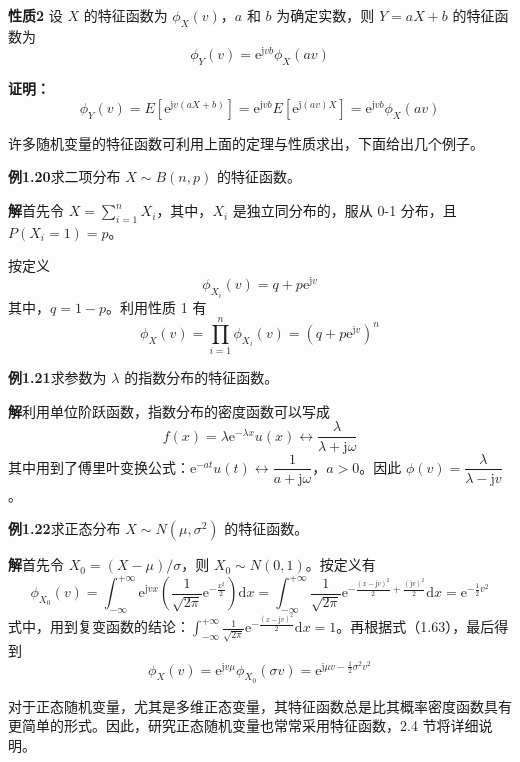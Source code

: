 \documentclass[11pt,openany,UTF8]{ctexbook}
\newcommand{\dif}{\mathrm{d}}                      %
\newcommand{\eu}{\mathrm{e}}                       %
\newcommand{\ju}{\mathrm{j}}                       %
\newcommand{\thm}[1]{\par\medskip\noindent\textbf{#1}\quad}
\begin{document}
\thm{性质2} 设 $X$ 的特征函数为 $\phi_X(v)$\nobreak，$a$ 和 $b$ 为确定实数\nobreak，则 $Y=aX+b$ 的特征函数为
\begin{equation}
\phi_Y(v)=\eu^{\ju vb}\phi_X(av)
\label{eq:1.63}
\end{equation}

\textbf{证明\nobreak：}\quad
\[
\phi_Y(v)=E\left[\eu^{\ju v(aX+b)}\right]=\eu^{\ju vb}E\left[\eu^{\ju(av)X}\right]=\eu^{\ju vb}\phi_X(av)
\]

许多随机变量的特征函数可利用上面的定理与性质求出\nobreak，下面给出几个例子\nobreak。

\begin{examplebox}
\textbf{例1.20}\quad 求二项分布 $X\sim B(n,p)$ 的特征函数\nobreak。

\textbf{解}\quad 首先令 $X=\sum\limits_{i=1}^{n}X_i$\nobreak，其中\nobreak，$X_i$ 是独立同分布的\nobreak，服从 0-1 分布\nobreak，且 $P(X_i=1)=p$\nobreak。

按定义
\[
\phi_{X_i}(v)=q+p\eu^{\ju v}
\]
其中\nobreak，$q=1-p$\nobreak。利用性质 1 有
\[
\phi_X(v)=\prod_{i=1}^{n}\phi_{X_i}(v)=(q+p\eu^{\ju v})^n
\]

\textbf{例1.21}\quad 求参数为 $\lambda$ 的指数分布的特征函数\nobreak。

\textbf{解}\quad 利用单位阶跃函数\nobreak，指数分布的密度函数可以写成
\[
f(x)=\lambda\eu^{-\lambda x}u(x)\leftrightarrow\frac{\lambda}{\lambda+\ju\omega}
\]
其中用到了傅里叶变换公式\nobreak：$\eu^{-at}u(t)\leftrightarrow\dfrac{1}{a+\ju\omega}$\nobreak，$a>0$\nobreak。因此 $\phi(v)=\dfrac{\lambda}{\lambda-\ju v}$\nobreak。

\textbf{例1.22}\quad 求正态分布 $X\sim N(\mu,\sigma^2)$ 的特征函数\nobreak。

\textbf{解}\quad 首先令 $X_0=(X-\mu)/\sigma$\nobreak，则 $X_0\sim N(0,1)$\nobreak。按定义有
\[
\phi_{X_0}(v)=\int_{-\infty}^{+\infty}\eu^{\ju vx}\left(\frac{1}{\sqrt{2\pi}}\eu^{-\frac{x^2}{2}}\right)\dif x
=\int_{-\infty}^{+\infty}\frac{1}{\sqrt{2\pi}}\eu^{-\frac{(x-\ju v)^2}{2}+\frac{(\ju v)^2}{2}}\dif x
=\eu^{-\frac{1}{2}v^2}
\]
式中\nobreak，用到复变函数的结论\nobreak：$\displaystyle\int_{-\infty}^{+\infty}\frac{1}{\sqrt{2\pi}}\eu^{-\frac{(x-\ju v)^2}{2}}\dif x=1$\nobreak。再根据式（1.63\nobreak）\nobreak，最后得到
\[
\phi_X(v)=\eu^{\ju v\mu}\phi_{X_0}(\sigma v)=\eu^{\ju\mu v-\frac{1}{2}\sigma^2v^2}
\]
\end{examplebox}

对于正态随机变量\nobreak，尤其是多维正态变量\nobreak，其特征函数总是比其概率密度函数具有更简单的形式\nobreak。因此\nobreak，研究正态随机变量也常常采用特征函数\nobreak，2.4 节将详细说明\nobreak。
\end{document}
